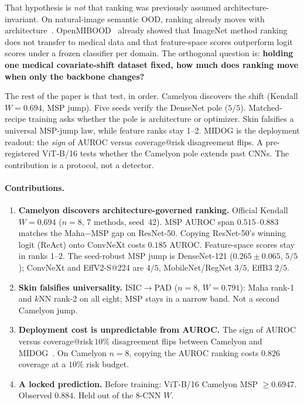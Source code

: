 \documentclass[10pt,twocolumn,letterpaper]{article}
\begin{document}
That hypothesis is \emph{not} that ranking was previously assumed architecture-invariant.
On natural-image semantic OOD, ranking already moves with architecture~\cite{zhang2023openoodv15,szyc2023uai,datko2026eswa,claros2025arxiv}.
OpenMIBOOD~\cite{openmibood2025} already showed that ImageNet method ranking does not transfer to medical data and that feature-space scores outperform logit scores under a frozen classifier per domain.
The orthogonal question is: \textbf{holding one medical covariate-shift dataset fixed, how much does ranking move when only the backbone changes?}

The rest of the paper is that test, in order.
Camelyon discovers the shift (Kendall $W=0.694$, MSP jump).
Five seeds verify the DenseNet pole ($5/5$).
Matched-recipe training asks whether the pole is architecture or optimizer.
Skin falsifies a universal MSP-jump law, while feature ranks stay 1--2.
MIDOG is the deployment readout: the \emph{sign} of AUROC versus coverage@risk disagreement flips.
A pre-registered ViT-B/16 tests whether the Camelyon pole extends past CNNs.
The contribution is a protocol, not a detector.

\paragraph{Contributions.}
\begin{enumerate}
\item \textbf{Camelyon discovers architecture-governed ranking.}
Official Kendall $W=0.694$ ($n{=}8$, 7 methods, seed~42).
MSP AUROC span $0.515$--$0.883$ matches the Maha${-}$MSP gap on ResNet-50.
Copying ResNet-50's winning logit (ReAct) onto ConvNeXt costs $0.185$ AUROC.
Feature-space scores stay in ranks 1--2.
The seed-robust MSP jump is DenseNet-121 ($0.265{\pm}0.065$, $5/5$); ConvNeXt and EffV2-S@224 are $4/5$, MobileNet/RegNet $3/5$, EffB3 $2/5$.
\item \textbf{Skin falsifies universality.}
ISIC$\to$PAD ($n{=}8$, $W{=}0.791$): Maha rank-1 and $k$NN rank-2 on all eight; MSP stays in a narrow band. Not a second Camelyon jump.
\item \textbf{Deployment cost is unpredictable from AUROC.}
The sign of AUROC versus coverage@risk\,$10\%$ disagreement flips between Camelyon and MIDOG~\cite{geifman2019selectivenet,traub2024augrc}.
On Camelyon $n{=}8$, copying the AUROC ranking costs $0.826$ coverage at a $10\%$ risk budget.
\item \textbf{A locked prediction.}
Before training: ViT-B/16 Camelyon MSP ${\ge}0.6947$. Observed $0.884$. Held out of the 8-CNN $W$.
\end{enumerate}
\end{document}
